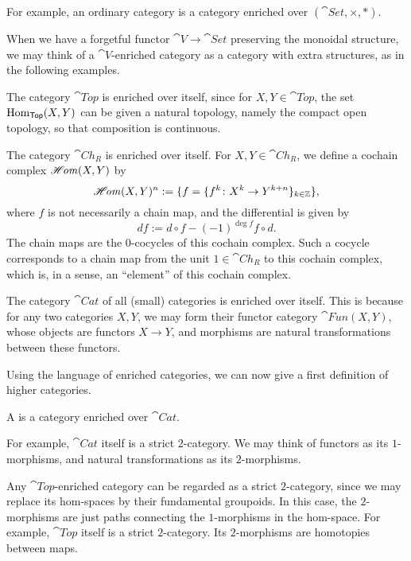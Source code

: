For example,
an ordinary category is a category
enriched over $(\cat{Set},\times,*)$.

When we have a forgetful functor $\cat V\to\cat{Set}$
preserving the monoidal structure,
we may think of a $\cat V$-enriched category
as a category with extra structures,
as in the following examples.

\begin{example}
    The category $\cat{Top}$ is enriched over itself,
    since for $X,Y\in\cat{Top}$,
    the set $\operatorname{Hom}_{\mathsf{Top}}(X,Y)$ can be given a natural topology,
    namely the compact open topology,
    so that composition is continuous. \varqed
\end{example}

\begin{example}\label{eg-1-c}
    The category $\cat{Ch}_R$ is enriched over itself.
    For $X,Y\in\cat{Ch}_R$, we define a cochain complex $\mathscr{H}\mkern-3mu\mathit{om}(X,Y)$ by
    \[ \mathscr{H}\mkern-3mu\mathit{om}(X,Y)^n:=\{f=\{f^k\colon X^k\to Y^{k+n}\}_{k\in\mathbb Z}\}, \]
    where $f$ is not necessarily a chain map,
    and the differential is given by
    \[ df:=d\circ f-(-1)^{\deg f}f\circ d. \]
    The chain maps are the $0$-cocycles of this cochain complex.
    Such a cocycle corresponds to a chain map
    from the unit $1\in\cat{Ch}_R$ to this cochain complex, which is,
    in a sense, an ``element'' of this cochain complex. \varqed
\end{example}

\begin{example}
    The category $\cat{Cat}$ of all (small) categories
    is enriched over itself.
    This is because for any two categories $X,Y$,
    we may form their functor category $\cat{Fun}(X,Y)$,
    whose objects are functors $X\to Y$,
    and morphisms are natural transformations between these functors. \varqed
\end{example}

Using the language of enriched categories,
we can now give a first definition of higher categories.

\begin{definition}
    A  is a category enriched over $\cat{Cat}$.
\end{definition}

For example, $\cat{Cat}$ itself is a strict $2$-category.
We may think of functors as its $1$-morphisms,
and natural transformations as its $2$-morphisms.

Any $\cat{Top}$-enriched category can be regarded as a
strict $2$-category,
since we may replace its hom-spaces by
their fundamental groupoids.
In this case, the $2$-morphisms are just
paths connecting the $1$-morphisms in the hom-space.
For example, $\cat{Top}$ itself is a strict $2$-category.
Its $2$-morphisms are homotopies between maps.

